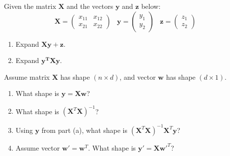 \documentclass{harvardml}
\theoremstyle{definition}
\theoremstyle{plain}
\begin{document}
\begin{problem}
		    Given the matrix $\mathbf{X}$ and the vectors $\mathbf{y}$ and $\mathbf{z}$  below:
		    \begin{equation*}
		        \mathbf{X} = \begin{pmatrix}
		        x_{11} & x_{12}\\
		        x_{21} & x_{22}
		        \end{pmatrix} \hspace{10pt} \mathbf{y} = \begin{pmatrix} y_{1} \\ y_{2} \end{pmatrix} \hspace{10pt} \mathbf{z} = \begin{pmatrix} z_{1} \\ z_{2} \end{pmatrix} \hspace{10pt} 
		    \end{equation*}  
		    \begin{enumerate}[label=(\alph*)]
		        \item Expand $\mathbf{X}\mathbf{y} + \mathbf{z}$.
		        
		        \item Expand $\mathbf{y^T}\mathbf{X}\mathbf{y}$.

		    \end{enumerate}
		\end{problem}

\begin{problem}

Assume matrix $\mathbf{X}$ has shape $(n \times d)$, and vector $\mathbf{w}$ has shape $(d \times 1)$.

\begin{enumerate}[label=(\alph*)]
		        
		        \item What shape is $\mathbf{y} =  \mathbf{X} \mathbf{w}$?
		        
		        \item What shape is $(\mathbf{X}^T \mathbf{X})^{-1}$?
		        
		        \item Using $\mathbf{y}$ from part (a), what shape is $(\mathbf{X}^T \mathbf{X})^{-1} \mathbf{X}^T \mathbf{y}$?
		        
		        \item Assume vector $\mathbf{w}' = \mathbf{w}^T$.  What shape is $\mathbf{y}' = \mathbf{X}\mathbf{w}'^T $?  

		    \end{enumerate}

\end{problem}
\end{document}
